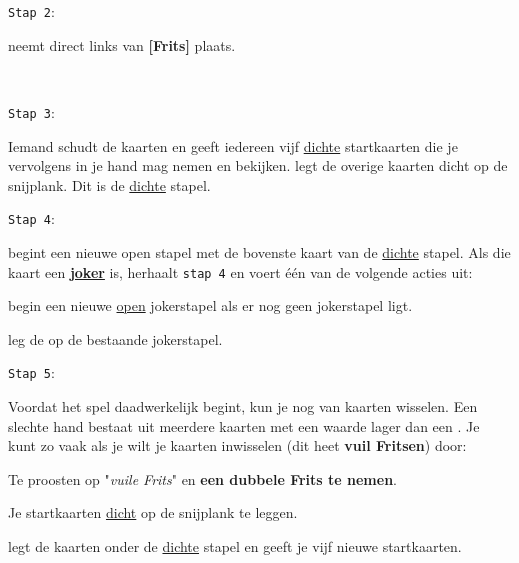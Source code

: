 \noindent
\begin{minipage}[t]{.09\textwidth}
\texttt{Stap 2}:
\end{minipage}
\hfill
\begin{minipage}[t]{.91\textwidth}
\Willem neemt direct links van \textbf{[Frits]} plaats. 
\end{minipage}
\\

\noindent
\begin{minipage}[t]{.09\textwidth}
\texttt{Stap 3}:
\end{minipage}
\hfill
\begin{minipage}[t]{.91\textwidth}
Iemand schudt de kaarten en \Frits geeft iedereen vijf \ul{dichte} startkaarten die je vervolgens in je hand mag nemen en bekijken. \Frits legt de overige kaarten dicht op de snijplank. Dit is de \ul{dichte} stapel. \\
\end{minipage}

\noindent
\begin{minipage}[t]{.09\textwidth}
\texttt{Stap 4}:
\end{minipage}
\hfill
\begin{minipage}[t]{.91\textwidth}
\Frits begint een nieuwe open stapel met de bovenste kaart van de \ul{dichte} stapel. Als die kaart een \textbf{\ul{joker}} is, herhaalt \Frits \texttt{stap 4} en voert \'e\'en van de volgende acties uit:
\puntLijst{}
    \item begin een nieuwe \ul{open} jokerstapel als er nog geen jokerstapel ligt.
    \item leg de  op de bestaande jokerstapel.
\eindPuntLijst{}
\end{minipage}

\vspace*{+0.35cm} 

\noindent
\begin{minipage}[t]{.09\textwidth}
\texttt{Stap 5}:
\end{minipage}
\hfill
\begin{minipage}[t]{.91\textwidth}
Voordat het spel daadwerkelijk begint, kun je nog van kaarten wisselen. Een slechte hand bestaat uit meerdere kaarten met een waarde lager dan een . Je kunt zo vaak als je wilt je kaarten inwisselen (dit heet \textbf{vuil Fritsen}) door:
\numeriekeLijst{}
    \item Te proosten op "\textit{vuile Frits}" en \textbf{een dubbele Frits te nemen}.
    \item Je startkaarten \ul{dicht} op de snijplank te leggen.
    \item \Frits legt de kaarten onder de \ul{dichte} stapel en geeft je vijf nieuwe startkaarten.
\eindNumeriekeLijst{}
\end{minipage}
\vspace*{+0.3cm} 
    

